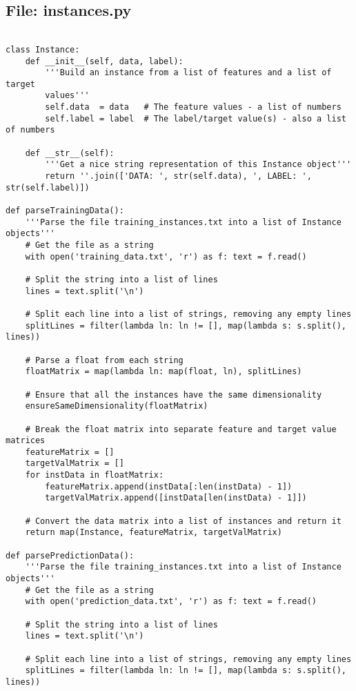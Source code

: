 \documentclass{article}
\begin{document}
\subsection*{File: instances.py}
\begin{verbatim}

class Instance:
    def __init__(self, data, label):
        '''Build an instance from a list of features and a list of target
        values'''
        self.data  = data   # The feature values - a list of numbers
        self.label = label  # The label/target value(s) - also a list of numbers

    def __str__(self):
        '''Get a nice string representation of this Instance object'''
        return ''.join(['DATA: ', str(self.data), ', LABEL: ', str(self.label)])
    
def parseTrainingData():
    '''Parse the file training_instances.txt into a list of Instance objects'''
    # Get the file as a string
    with open('training_data.txt', 'r') as f: text = f.read()

    # Split the string into a list of lines
    lines = text.split('\n')

    # Split each line into a list of strings, removing any empty lines
    splitLines = filter(lambda ln: ln != [], map(lambda s: s.split(), lines))

    # Parse a float from each string
    floatMatrix = map(lambda ln: map(float, ln), splitLines)

    # Ensure that all the instances have the same dimensionality
    ensureSameDimensionality(floatMatrix)

    # Break the float matrix into separate feature and target value matrices
    featureMatrix = []
    targetValMatrix = []
    for instData in floatMatrix:
        featureMatrix.append(instData[:len(instData) - 1])
        targetValMatrix.append([instData[len(instData) - 1]])

    # Convert the data matrix into a list of instances and return it
    return map(Instance, featureMatrix, targetValMatrix)

def parsePredictionData():
    '''Parse the file training_instances.txt into a list of Instance objects'''
    # Get the file as a string
    with open('prediction_data.txt', 'r') as f: text = f.read()

    # Split the string into a list of lines
    lines = text.split('\n')

    # Split each line into a list of strings, removing any empty lines
    splitLines = filter(lambda ln: ln != [], map(lambda s: s.split(), lines))


\end{verbatim}
\end{document}
